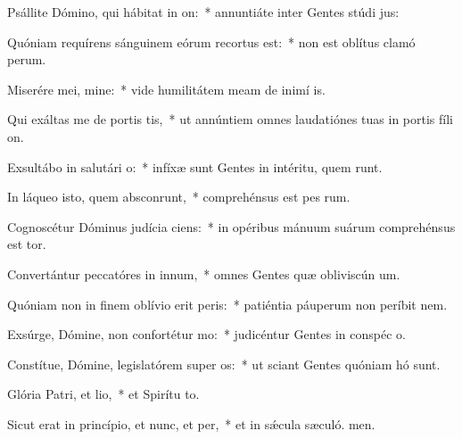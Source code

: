 \item Psállite Dómino, qui hábitat in on:~* annuntiáte inter Gentes stúdi jus:
\item Quóniam requírens sánguinem eórum recortus est:~* non est oblítus clamó perum.
\item Miserére mei, mine:~* vide humilitátem meam de inimí is.
\item Qui exáltas me de portis tis,~* ut annúntiem omnes laudatiónes tuas in portis fíli on.
\item Exsultábo in salutári o:~* infíxæ sunt Gentes in intéritu, quem runt.
\item In láqueo isto, quem absconrunt,~* comprehénsus est pes rum.
\item Cognoscétur Dóminus judícia ciens:~* in opéribus mánuum suárum comprehénsus est tor.
\item Convertántur peccatóres in innum,~* omnes Gentes quæ obliviscún um.
\item Quóniam non in finem oblívio erit peris:~* patiéntia páuperum non períbit  nem.
\item Exsúrge, Dómine, non confortétur mo:~* judicéntur Gentes in conspéc o.
\item Constítue, Dómine, legislatórem super os:~* ut sciant Gentes quóniam hó sunt.
\item Glória Patri, et lio,~* et Spirítu to.
\item Sicut erat in princípio, et nunc, et per,~* et in sǽcula sæculó. men.
